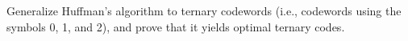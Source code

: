 Generalize Huffman's algorithm to ternary codewords (i.e., codewords using the 
symbols 0, 1, and 2), and prove that it yields optimal ternary codes.